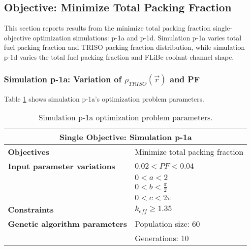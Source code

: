 \subsection{Objective: Minimize Total Packing Fraction}
This section reports results from the minimize total packing fraction single-objective
optimization simulations: p-1a and p-1d. 
Simulation p-1a varies total fuel packing fraction and \gls{TRISO} packing fraction 
distribution, while simulation p-1d varies the total fuel packing fraction and 
\gls{FLiBe} coolant channel shape. 

\subsubsection{Simulation p-1a: Variation of $\rho_{TRISO}(\vec{r})$ and PF}
Table \ref{tab:simulationp1a} shows simulation p-1a's optimization problem parameters. 
\begin{table}[htbp!]
    \centering
    \onehalfspacing
    \caption{Simulation p-1a optimization problem parameters.}
	\label{tab:simulationp1a}
    \footnotesize
    \begin{tabular}{l|p{5cm}}
    \hline 
    \multicolumn{2}{c}{\textbf{Single Objective: Simulation p-1a}} \\
    \hline 
    \textbf{Objectives} & Minimize total packing fraction \\
    \hline 
    \textbf{Input parameter variations} & $0.02<PF<0.04$ \\
    & $0<a<2$ \\
    & $0<b<\frac{\pi}{2}$ \\
    & $0<c<2\pi$ \\
    \hline
    \textbf{Constraints} & $k_{eff} \geq 1.35$\\ 
    \hline 
    \textbf{Genetic algorithm parameters} & Population size: 60 \\
    & Generations: 10 \\
    \hline
    \end{tabular}
\end{table}

